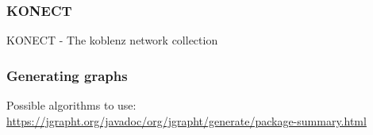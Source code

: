 \subsubsection{KONECT}

KONECT - The koblenz network collection\cite{Kunegis2013}

\subsubsection{Generating graphs}

Possible algorithms to use: \url{https://jgrapht.org/javadoc/org/jgrapht/generate/package-summary.html}


